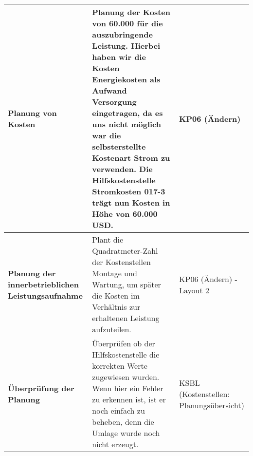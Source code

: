 \begin{tabular}{|L{3.5cm}L{9cm}L{3.5cm}|}
\textbf{Planung von Kosten} & Planung der Kosten von 60.000 für die auszubringende Leistung. Hierbei haben wir die Kosten Energiekosten als Aufwand Versorgung eingetragen, da es uns nicht möglich war die selbsterstellte Kostenart Strom zu verwenden. Die Hilfskostenstelle Stromkosten 017-3 trägt nun Kosten in Höhe von 60.000 USD. & KP06 (Ändern) \\ \hline
\textbf{Planung der innerbetrieblichen Leistungsaufnahme} & Plant die Quadratmeter-Zahl der Kostenstellen Montage und Wartung, um später die Kosten im Verhältnis zur erhaltenen Leistung aufzuteilen. & KP06 (Ändern) -  Layout 2 \\ \hline
\textbf{Überprüfung der Planung} & Überprüfen ob der Hilfskostenstelle die korrekten Werte zugewiesen wurden.
Wenn hier ein Fehler zu erkennen ist, ist er noch einfach zu beheben, denn die Umlage wurde noch nicht erzeugt. & KSBL (Kostenstellen: Planungsübersicht) \\ \hline
\end{tabular}
